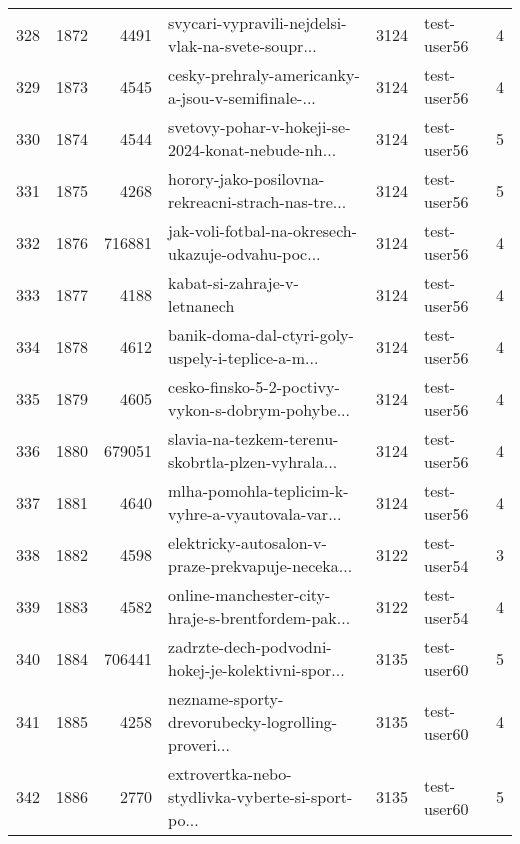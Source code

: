 \begin{tabular}{lrrlrlr}
328  &       1872 &     4491 &  svycari-vypravili-nejdelsi-vlak-na-svete-soupr... &     3124 &                  test-user56 &               4 \\
329  &       1873 &     4545 &  cesky-prehraly-americanky-a-jsou-v-semifinale-... &     3124 &                  test-user56 &               4 \\
330  &       1874 &     4544 &  svetovy-pohar-v-hokeji-se-2024-konat-nebude-nh... &     3124 &                  test-user56 &               5 \\
331  &       1875 &     4268 &  horory-jako-posilovna-rekreacni-strach-nas-tre... &     3124 &                  test-user56 &               5 \\
332  &       1876 &   716881 &  jak-voli-fotbal-na-okresech-ukazuje-odvahu-poc... &     3124 &                  test-user56 &               4 \\
333  &       1877 &     4188 &                       kabat-si-zahraje-v-letnanech &     3124 &                  test-user56 &               4 \\
334  &       1878 &     4612 &  banik-doma-dal-ctyri-goly-uspely-i-teplice-a-m... &     3124 &                  test-user56 &               4 \\
335  &       1879 &     4605 &  cesko-finsko-5-2-poctivy-vykon-s-dobrym-pohybe... &     3124 &                  test-user56 &               4 \\
336  &       1880 &   679051 &  slavia-na-tezkem-terenu-skobrtla-plzen-vyhrala... &     3124 &                  test-user56 &               4 \\
337  &       1881 &     4640 &  mlha-pomohla-teplicim-k-vyhre-a-vyautovala-var... &     3124 &                  test-user56 &               4 \\
338  &       1882 &     4598 &  elektricky-autosalon-v-praze-prekvapuje-neceka... &     3122 &                  test-user54 &               3 \\
339  &       1883 &     4582 &  online-manchester-city-hraje-s-brentfordem-pak... &     3122 &                  test-user54 &               4 \\
340  &       1884 &   706441 &  zadrzte-dech-podvodni-hokej-je-kolektivni-spor... &     3135 &                  test-user60 &               5 \\
341  &       1885 &     4258 &  nezname-sporty-drevorubecky-logrolling-proveri... &     3135 &                  test-user60 &               4 \\
342  &       1886 &     2770 &  extrovertka-nebo-stydlivka-vyberte-si-sport-po... &     3135 &                  test-user60 &               5 \\

\end{tabular}
